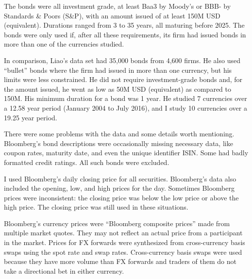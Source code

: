 The bonds were all investment grade, at least Baa3 by Moody's or BBB- by Standards \& Poors (S\&P), with an amount issued of at least 150M USD (equivalent).   Durations ranged from 3 to 35 years, all maturing before 2025.  The bonds were only used if, after all these requirements, its firm had issued bonds in more than one of the currencies studied.  %



In comparison, Liao's data set had 35,000 bonds from 4,600 firms.  He also used ``bullet'' bonds where the firm had issued in more than one currency, but his limits were less constrained.   He did not require investment-grade bonds and, for the amount issued, he went as low as 50M USD (equivalent) as compared to 150M.  His minimum duration for a bond was 1 year.   He studied 7 currencies over a 12.58 year period (January 2004 to July 2016), and I study 10 currencies over a 19.25 year period.

There were some problems with the data and some details worth mentioning.  Bloomberg's bond descriptions were occasionally missing necessary data, like coupon rates, maturity date, and even the unique identifier ISIN.  Some had badly formatted credit ratings.  All such bonds were excluded.


I used Bloomberg's daily closing price for all securities.  Bloomberg's data also included the opening, low, and high prices for the day.  Sometimes Bloomberg prices were inconsistent: the closing price was below the low price or above the high price.  The closing price was still used in these situations.  


Bloomberg's currency prices were ``Bloomberg composite prices'' made from multiple market quotes.  They may not reflect an actual price from a participant in the market.  Prices for FX forwards were synthesized from cross-currency basis swaps using the spot rate and swap rates.  Cross-currency basis swaps were used because they have more volume than FX forwards and traders of them do not take a directional bet in either currency.  

